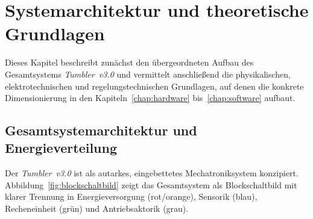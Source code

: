 \chapter{Systemarchitektur und theoretische Grundlagen}
\label{chap:grundlagen}

Dieses Kapitel beschreibt zunächst den übergeordneten Aufbau des Gesamtsystems \emph{Tumbler~v3.0} und vermittelt anschließend die physikalischen, elektrotechnischen und regelungstechnischen Grundlagen, auf denen die konkrete Dimensionierung in den Kapiteln~\ref{chap:hardware} bis~\ref{chap:software} aufbaut.

\section{Gesamtsystemarchitektur und Energieverteilung}
\label{sec:systemarchitektur}
Der \emph{Tumbler~v3.0} ist als autarkes, eingebettetes Mechatroniksystem konzipiert. Abbildung~\ref{fig:blockschaltbild} zeigt das Gesamtsystem als Blockschaltbild mit klarer Trennung in Energieversorgung (rot/orange), Sensorik (blau), Recheneinheit (grün) und Antriebsaktorik (grau).

